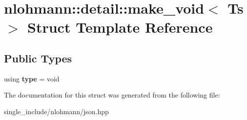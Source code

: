 \hypertarget{structnlohmann_1_1detail_1_1make__void}{}\section{nlohmann\+:\+:detail\+:\+:make\+\_\+void$<$ Ts $>$ Struct Template Reference}
\label{structnlohmann_1_1detail_1_1make__void}
\subsection*{Public Types}
\begin{DoxyCompactItemize}
\item 
\mbox{\label{structnlohmann_1_1detail_1_1make__void_a8961e24ae3b2cb65ec47d1ce805d94e4}} 
using {\bfseries type} = void
\end{DoxyCompactItemize}


The documentation for this struct was generated from the following file\+:\begin{DoxyCompactItemize}
\item 
single\+\_\+include/nlohmann/json.\+hpp\end{DoxyCompactItemize}
